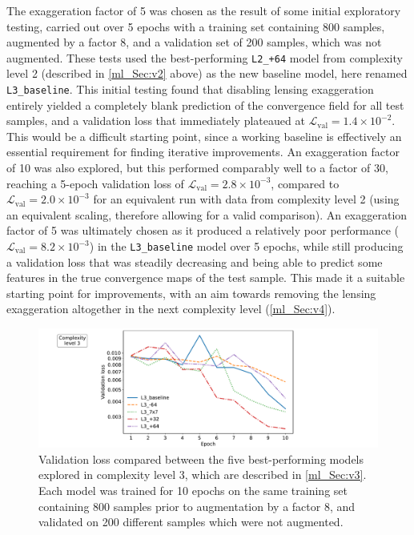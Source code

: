 The exaggeration factor of 5 was chosen as the result of some initial exploratory testing, carried out over 5 epochs with a training set containing 800 samples, augmented by a factor 8, and a validation set of 200 samples, which was not augmented. These tests used the best-performing \texttt{L2\_+64} model from complexity level 2 (described in \autoref{ml_Sec:v2} above) as the new baseline model, here renamed \texttt{L3\_baseline}. This initial testing found that disabling lensing exaggeration entirely yielded a completely blank prediction of the convergence field for all test samples, and a validation loss that immediately plateaued at $\mathcal{L}_\text{val} = 1.4 \times 10^{-2}$. This would be a difficult starting point, since a working baseline is effectively an essential requirement for finding iterative improvements. An exaggeration factor of 10 was also explored, but this performed comparably well to a factor of 30, reaching a 5-epoch validation loss of $\mathcal{L}_\text{val} = 2.8 \times 10^{-3}$, compared to $\mathcal{L}_\text{val} = 2.0 \times 10^{-3}$ for an equivalent run with data from complexity level 2 (using an equivalent scaling, therefore allowing for a valid comparison). An exaggeration factor of 5 was ultimately chosen as it produced a relatively poor performance ($\mathcal{L}_\text{val} = 8.2 \times 10^{-3}$) in the \texttt{L3\_baseline} model over 5 epochs, while still producing a validation loss that was steadily decreasing and being able to predict some features in the true convergence maps of the test sample. This made it a suitable starting point for improvements, with an aim towards removing the lensing exaggeration altogether in the next complexity level (\autoref{ml_Sec:v4}).

\begin{figure}[tp]
\includegraphics[width=\textwidth]{v3_loss}
\caption{Validation loss compared between the five best-performing models explored in complexity level 3, which are described in \autoref{ml_Sec:v3}. Each model was trained for 10 epochs on the same training set containing 800 samples prior to augmentation by a factor 8, and validated on 200 different samples which were not augmented.}
\label{ml_Fig:v3_loss}
\end{figure}


